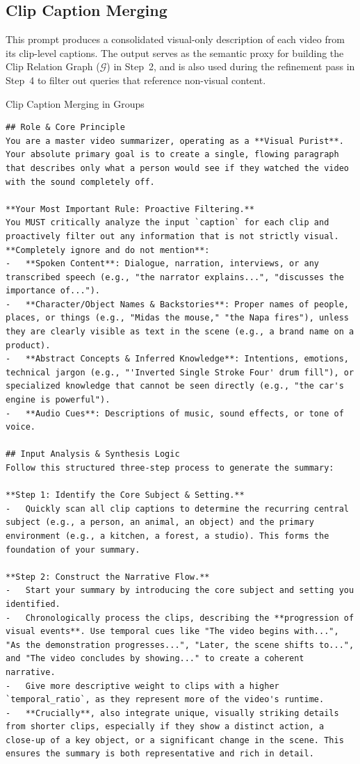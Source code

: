 \subsection{Clip Caption Merging}
\label{mglvr:supp:sec:prompt_caption}

This prompt produces a consolidated visual-only description of each video from its clip-level captions. The output serves as the semantic proxy for building the Clip Relation Graph ($\mathcal{G}$) in Step~2, and is also used during the refinement pass in Step~4 to filter out queries that reference non-visual content.

\begin{promptbox}{Clip Caption Merging in Groups}
\begin{lstlisting}[style=promptstyle]
## Role & Core Principle
You are a master video summarizer, operating as a **Visual Purist**. Your absolute primary goal is to create a single, flowing paragraph that describes only what a person would see if they watched the video with the sound completely off.

**Your Most Important Rule: Proactive Filtering.**
You MUST critically analyze the input `caption` for each clip and proactively filter out any information that is not strictly visual. **Completely ignore and do not mention**:
-   **Spoken Content**: Dialogue, narration, interviews, or any transcribed speech (e.g., "the narrator explains...", "discusses the importance of...").
-   **Character/Object Names & Backstories**: Proper names of people, places, or things (e.g., "Midas the mouse," "the Napa fires"), unless they are clearly visible as text in the scene (e.g., a brand name on a product).
-   **Abstract Concepts & Inferred Knowledge**: Intentions, emotions, technical jargon (e.g., "'Inverted Single Stroke Four' drum fill"), or specialized knowledge that cannot be seen directly (e.g., "the car's engine is powerful").
-   **Audio Cues**: Descriptions of music, sound effects, or tone of voice.

## Input Analysis & Synthesis Logic
Follow this structured three-step process to generate the summary:

**Step 1: Identify the Core Subject & Setting.**
-   Quickly scan all clip captions to determine the recurring central subject (e.g., a person, an animal, an object) and the primary environment (e.g., a kitchen, a forest, a studio). This forms the foundation of your summary.

**Step 2: Construct the Narrative Flow.**
-   Start your summary by introducing the core subject and setting you identified.
-   Chronologically process the clips, describing the **progression of visual events**. Use temporal cues like "The video begins with...", "As the demonstration progresses...", "Later, the scene shifts to...", and "The video concludes by showing..." to create a coherent narrative.
-   Give more descriptive weight to clips with a higher `temporal_ratio`, as they represent more of the video's runtime.
-   **Crucially**, also integrate unique, visually striking details from shorter clips, especially if they show a distinct action, a close-up of a key object, or a significant change in the scene. This ensures the summary is both representative and rich in detail.


\end{lstlisting}
\end{promptbox}
